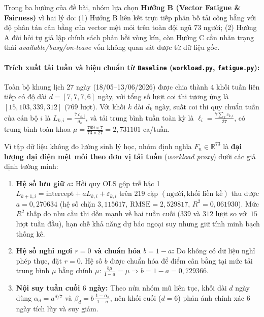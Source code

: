 Trong ba hướng của đề bài, nhóm lựa chọn \textbf{Hướng B (Vector Fatigue \& Fairness)} vì hai lý do: (1) Hướng B liên kết trực tiếp phân bố tải công bằng với độ phân tán cân bằng của vector mệt mỏi trên toàn đội ngũ $73$ người; (2) Hướng A đòi hỏi tự giả lập chính sách phản hồi vòng kín, còn Hướng C cần nhãn trạng thái \textit{available/busy/on-leave} vốn không quan sát được từ dữ liệu gốc.

\paragraph*{Trích xuất tải tuần và hiệu chuẩn từ \texttt{Baseline} (\texttt{workload.py}, \texttt{fatigue.py}):}
Toàn bộ khung lịch $27$ ngày (18/05--13/06/2026) được chia thành $4$ khối tuần liên tiếp có độ dài $d = [7, 7, 7, 6]$ ngày, với tổng số lượt coi thi tương ứng là $[15, 103, 339, 312]$ ($769$ lượt). Với khối $k$ dài $d_k$ ngày, suất coi thi quy chuẩn tuần của cán bộ $i$ là $L_{k,i} = \frac{7\, c_{k,i}}{d_k}$, và tải trung bình tuần toàn kỳ là $\ell_i = \frac{7 \sum_k c_{k,i}}{27}$, có trung bình toàn khoa $\mu = \frac{769 \times 7}{73 \times 27} = 2{,}731101$ ca/tuần.

Vì tập dữ liệu không đo lường sinh lý học, nhóm định nghĩa $F_{n} \in \mathbb{R}^{73}$ là \textbf{đại lượng đại diện mệt mỏi theo đơn vị tải tuần} (\textit{workload proxy}) dưới các giả định tường minh:
\begin{enumerate}
    \item \textbf{Hệ số lưu giữ $a$:} Hồi quy OLS gộp trễ bậc 1 $L_{k+1,i} = \text{intercept} + a L_{k,i} + \varepsilon_{k,i}$ trên $219$ cặp $(\text{người}, \text{khối liền kề})$ thu được $a = 0{,}270634$ (hệ số chặn $3{,}115617$, $\text{RMSE} = 2{,}529817$, $R^2 = 0{,}061930$). Mức $R^2$ thấp do nhu cầu thi dồn mạnh về hai tuần cuối ($339$ và $312$ lượt so với $15$ lượt tuần đầu), hạn chế khả năng dự báo ngoại suy nhưng giữ tính minh bạch thống kê.
    \item \textbf{Hệ số nghỉ ngơi $r = 0$ và chuẩn hóa $b = 1 - a$:} Do không có dữ liệu nghỉ phép thực, đặt $r = 0$. Hệ số $b$ được chuẩn hóa để điểm cân bằng tại mức tải trung bình $\mu$ bằng chính $\mu$: $\frac{b \mu}{1 - a} = \mu \Rightarrow b = 1 - a = 0{,}729366$.
    \item \textbf{Nội suy tuần cuối $6$ ngày:} Theo nửa nhóm mũ liên tục, khối dài $d$ ngày dùng $\alpha_d = a^{d/7}$ và $\beta_d = b\,\frac{1 - \alpha_d}{1 - a}$, nên khối cuối ($d=6$) phản ánh chính xác $6$ ngày tích lũy và suy giảm.
\end{enumerate}

